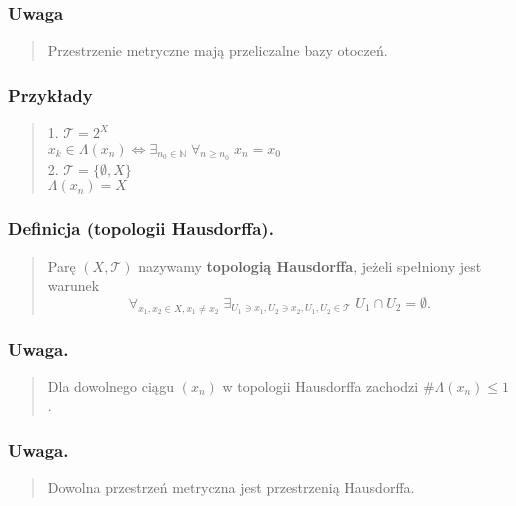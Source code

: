 \documentclass[10pt,a4paper]{article}
\begin{document}
{    \subsubsection*{Uwaga}
    \begin{quote}
    Przestrzenie metryczne mają przeliczalne bazy otoczeń.
    \end{quote}

    \subsubsection*{Przykłady}
    \begin{quote}
    1. $\mathcal{T} = 2^X$ \\
    $x_k \in \Lambda(x_n) \iff \exists_{n_0 \in \mathbb{N}} \; \forall_{n \geq n_0} \; x_n = x_0$ \\
    2. $\mathcal{T} = \{\emptyset, X\}$ \\
    $\Lambda(x_n) = X$
    \end{quote}

    \subsubsection*{Definicja (topologii Hausdorffa).}
    \begin{quote}
    Parę $(X, \mathcal{T})$ nazywamy \textbf{topologią Hausdorffa}, jeżeli spełniony jest warunek \\
    $$\forall_{x_1, x_2 \in X, x_1 \neq x_2} \; \exists_{U_1 \ni x_1, U_2 \ni x_2, U_1, U_2 \in \mathcal{T}} \; U_1 \cap U_2 = \emptyset.$$
    \end{quote}

    \subsubsection*{Uwaga.}
    \begin{quote}
    Dla dowolnego ciągu $(x_n)$ w topologii Hausdorffa zachodzi $\#\Lambda(x_n) \leq 1$.
    \end{quote}

    \subsubsection*{Uwaga.}
    \begin{quote}
    Dowolna przestrzeń metryczna jest przestrzenią Hausdorffa.
    \end{quote}

}
\end{document}
